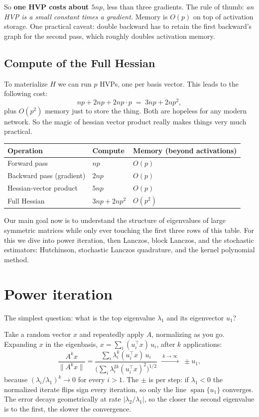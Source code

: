 \documentclass[11pt]{article}
\begin{document}
So \textbf{one HVP costs about $5np$}, less than three gradients. The rule of thumb: \emph{an HVP is a small constant times a gradient.} Memory is $O(p)$ on top of activation storage. One practical caveat: double backward has to retain the first backward's graph for the second pass, which roughly doubles activation memory.

\subsection{Compute of the Full Hessian}

To materialize $H$ we can run $p$ HVPs, one per basis vector. This leads to the following cost:
\[
np + 2np + 2np\cdot p \;=\; 3np + 2np^2 ,
\]
plus $O(p^2)$ memory just to store the thing. Both are hopeless for any modern network. So the magic of hessian vector product really makes things very much practical.

\begin{center}
\begin{tabular}{lll}
\toprule
Operation & Compute & Memory (beyond activations) \\
\midrule
Forward pass & $np$ & $O(p)$ \\
Backward pass (gradient) & $2np$ & $O(p)$ \\
Hessian-vector product & $5np$ & $O(p)$ \\
Full Hessian & $3np + 2np^2$ & $O(p^2)$ \\
\bottomrule
\end{tabular}
\end{center}

Our main goal now is to understand the structure of eigenvalues of large symmetric matrices while only ever touching the first three rows of this table. For this we dive into power iteration, then Lanczos, block Lanczos, and the stochastic estimators: Hutchinson, stochastic Lanczos quadrature, and the kernel polynomial method.

\section{Power iteration}

The simplest question: what is the top eigenvalue $\lambda_1$ and its eigenvector $u_1$?

Take a random vector $x$ and repeatedly apply $A$, normalizing as you go. Expanding $x$ in the eigenbasis, $x = \sum_i (u_i^\top x)\, u_i$, after $k$ applications:
\[
\frac{A^k x}{\|A^k x\|}
= \frac{\sum_i \lambda_i^k (u_i^\top x)\, u_i}{\big(\sum_i \lambda_i^{2k} (u_i^\top x)^2\big)^{1/2}}
\;\xrightarrow{\;k \to \infty\;}\; \pm u_1 ,
\]
because $(\lambda_i/\lambda_1)^k \to 0$ for every $i > 1$. The $\pm$ is per step: if $\lambda_1 < 0$ the normalized iterate flips sign every iteration, so only the line $\operatorname{span}\{u_1\}$ converges. The error decays geometrically at rate $|\lambda_2/\lambda_1|$, so the closer the second eigenvalue is to the first, the slower the convergence.
\end{document}
